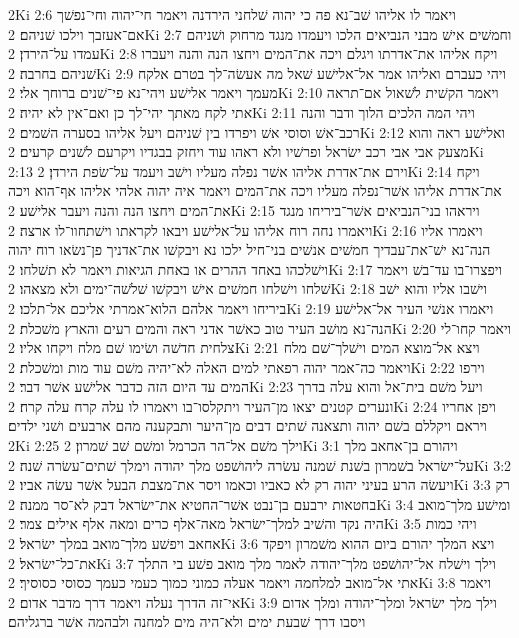 2Ki 2:6  ויאמר לו אליהו שׁב־נא פה כי יהוה שׁלחני הירדנה ויאמר חי־יהוה וחי־נפשׁך אם־אעזבך וילכו שׁניהם׃
2Ki 2:7  וחמשׁים אישׁ מבני הנביאים הלכו ויעמדו מנגד מרחוק ושׁניהם עמדו על־הירדן׃
2Ki 2:8  ויקח אליהו את־אדרתו ויגלם ויכה את־המים ויחצו הנה והנה ויעברו שׁניהם בחרבה׃
2Ki 2:9  ויהי כעברם ואליהו אמר אל־אלישׁע שׁאל מה אעשׂה־לך בטרם אלקח מעמך ויאמר אלישׁע ויהי־נא פי־שׁנים ברוחך אלי׃
2Ki 2:10  ויאמר הקשׁית לשׁאול אם־תראה אתי לקח מאתך יהי־לך כן ואם־אין לא יהיה׃
2Ki 2:11  ויהי המה הלכים הלוך ודבר והנה רכב־אשׁ וסוסי אשׁ ויפרדו בין שׁניהם ויעל אליהו בסערה השׁמים׃
2Ki 2:12  ואלישׁע ראה והוא מצעק אבי אבי רכב ישׂראל ופרשׁיו ולא ראהו עוד ויחזק בבגדיו ויקרעם לשׁנים קרעים׃
2Ki 2:13  וירם את־אדרת אליהו אשׁר נפלה מעליו וישׁב ויעמד על־שׂפת הירדן׃
2Ki 2:14  ויקח את־אדרת אליהו אשׁר־נפלה מעליו ויכה את־המים ויאמר איה יהוה אלהי אליהו אף־הוא ויכה את־המים ויחצו הנה והנה ויעבר אלישׁע׃
2Ki 2:15  ויראהו בני־הנביאים אשׁר־ביריחו מנגד ויאמרו נחה רוח אליהו על־אלישׁע ויבאו לקראתו וישׁתחוו־לו ארצה׃
2Ki 2:16  ויאמרו אליו הנה־נא ישׁ־את־עבדיך חמשׁים אנשׁים בני־חיל ילכו נא ויבקשׁו את־אדניך פן־נשׂאו רוח יהוה וישׁלכהו באחד ההרים או באחת הגיאות ויאמר לא תשׁלחו׃
2Ki 2:17  ויפצרו־בו עד־בשׁ ויאמר שׁלחו וישׁלחו חמשׁים אישׁ ויבקשׁו שׁלשׁה־ימים ולא מצאהו׃
2Ki 2:18  וישׁבו אליו והוא ישׁב ביריחו ויאמר אלהם הלוא־אמרתי אליכם אל־תלכו׃
2Ki 2:19  ויאמרו אנשׁי העיר אל־אלישׁע הנה־נא מושׁב העיר טוב כאשׁר אדני ראה והמים רעים והארץ משׁכלת׃
2Ki 2:20  ויאמר קחו־לי צלחית חדשׁה ושׂימו שׁם מלח ויקחו אליו׃
2Ki 2:21  ויצא אל־מוצא המים וישׁלך־שׁם מלח ויאמר כה־אמר יהוה רפאתי למים האלה לא־יהיה משׁם עוד מות ומשׁכלת׃
2Ki 2:22  וירפו המים עד היום הזה כדבר אלישׁע אשׁר דבר׃
2Ki 2:23  ויעל משׁם בית־אל והוא עלה בדרך ונערים קטנים יצאו מן־העיר ויתקלסו־בו ויאמרו לו עלה קרח עלה קרח׃
2Ki 2:24  ויפן אחריו ויראם ויקללם בשׁם יהוה ותצאנה שׁתים דבים מן־היער ותבקענה מהם ארבעים ושׁני ילדים׃
2Ki 2:25  וילך משׁם אל־הר הכרמל ומשׁם שׁב שׁמרון׃
2Ki 3:1  ויהורם בן־אחאב מלך על־ישׂראל בשׁמרון בשׁנת שׁמנה עשׂרה ליהושׁפט מלך יהודה וימלך שׁתים־עשׂרה שׁנה׃
2Ki 3:2  ויעשׂה הרע בעיני יהוה רק לא כאביו וכאמו ויסר את־מצבת הבעל אשׁר עשׂה אביו׃
2Ki 3:3  רק בחטאות ירבעם בן־נבט אשׁר־החטיא את־ישׂראל דבק לא־סר ממנה׃
2Ki 3:4  ומישׁע מלך־מואב היה נקד והשׁיב למלך־ישׂראל מאה־אלף כרים ומאה אלף אילים צמר׃
2Ki 3:5  ויהי כמות אחאב ויפשׁע מלך־מואב במלך ישׂראל׃
2Ki 3:6  ויצא המלך יהורם ביום ההוא משׁמרון ויפקד את־כל־ישׂראל׃
2Ki 3:7  וילך וישׁלח אל־יהושׁפט מלך־יהודה לאמר מלך מואב פשׁע בי התלך אתי אל־מואב למלחמה ויאמר אעלה כמוני כמוך כעמי כעמך כסוסי כסוסיך׃
2Ki 3:8  ויאמר אי־זה הדרך נעלה ויאמר דרך מדבר אדום׃
2Ki 3:9  וילך מלך ישׂראל ומלך־יהודה ומלך אדום ויסבו דרך שׁבעת ימים ולא־היה מים למחנה ולבהמה אשׁר ברגליהם׃
